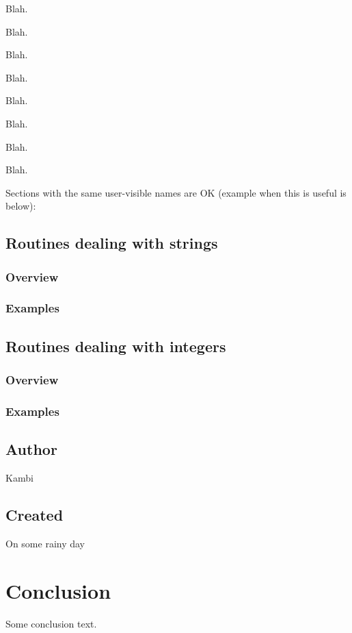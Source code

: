 \documentclass{report}
\begin{document}
Blah.

Blah.

Blah.

Blah.

Blah.

Blah.

Blah.

Blah.

Sections with the same user{-}visible names are OK (example when this is useful is below):

\section{Routines dealing with strings}


\subsection*{Overview}


\subsection*{Examples}


\section{Routines dealing with integers}


\subsection*{Overview}


\subsection*{Examples}
\section{Author}
\par
Kambi

\section{Created}
\par
On some rainy day


\chapter{Conclusion}
Some conclusion text.
\end{document}

